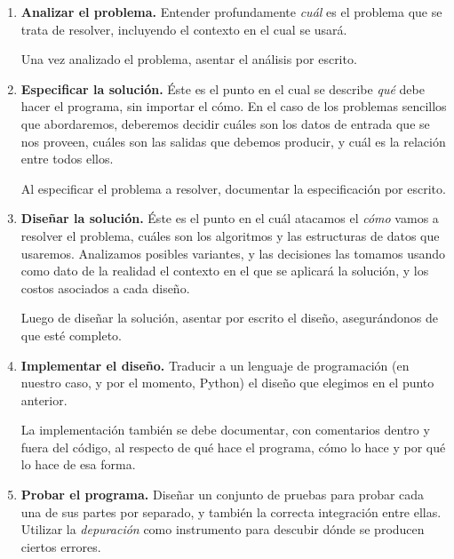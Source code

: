 \begin{enumerate}
\item {\bf Analizar el problema.} Entender profundamente {\it cuál} es
el problema que se trata de resolver, incluyendo el contexto en el
cual se usará.

\begin{observacion}
Una vez analizado el problema, asentar el análisis por escrito.
\end{observacion}

\item {\bf Especificar la solución.} Éste es el punto en el cual
se describe {\it qué} debe hacer el programa, sin importar
el cómo. En el caso de los problemas sencillos que abordaremos,
deberemos decidir cuáles son los datos de entrada que se nos
proveen, cuáles son las salidas que debemos producir, y cuál es la
relación entre todos ellos.

\begin{observacion}
Al especificar el problema a resolver, documentar la especificación por
escrito.
\end{observacion}

\item {\bf Diseñar la solución.} Éste es el punto en el cuál
atacamos el {\it cómo} vamos a resolver el problema, cuáles son
los algoritmos y las estructuras de datos que usaremos. Analizamos
posibles variantes, y las decisiones las tomamos usando como dato
de la realidad el contexto en el que se aplicará la solución, y
los costos asociados a cada diseño.

\begin{observacion}
Luego de diseñar la solución, asentar por escrito el diseño, asegurándonos de
que esté completo.
\end{observacion}

\item {\bf Implementar el diseño.} Traducir a un lenguaje de
programación (en nuestro caso, y por el momento, Python) el diseño
que elegimos en el punto anterior.

\begin{observacion}
La implementación también se debe documentar, con comentarios
dentro y fuera del código, al respecto de qué hace el programa, cómo lo hace y
por qué lo hace de esa forma.
\end{observacion}

\item {\bf Probar el programa.} Diseñar un conjunto de pruebas
para probar cada una de sus partes por separado, y también la
correcta integración entre ellas. Utilizar la {\it depuración} como
instrumento para descubir dónde se producen ciertos errores.


\end{enumerate}

